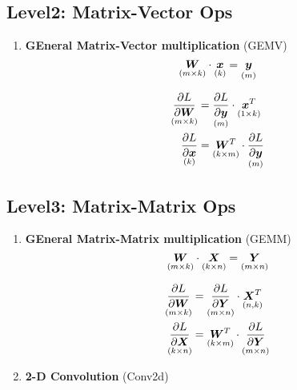 \documentclass[9pt,twocolumn,times]{article}
\begin{document}
\subsection{Level2: Matrix-Vector Ops}

\begin{enumerate}[leftmargin=*]
\item \textbf{GEneral Matrix-Vector multiplication} (GEMV)
\begin{equation}
	\underset{(m\times k)}{{\bm{W}}} \cdot \underset{(k)}{{\bm{x}}} =
	\underset{(m)}{{\bm{y}}}
\end{equation}
\begin{center}
	\resizebox{0.618\columnwidth}{!}{%
		
	}
\end{center}
\begin{align}
	\underset{(m\times k)}{\frac{\partial L}{\partial{\bm{W}}}} &=
	\underset{(m)}{\frac{\partial L}{\partial{\bm{y}}}} \cdot
	\underset{(1\times k)}{{\bm{x}}^T}\\
	\underset{(k)}{\frac{\partial L}{\partial{\bm{x}}}} &=
	\underset{(k\times m)}{{\bm{W}}^T} \cdot
	\underset{(m)}{\frac{\partial L}{\partial {\bm{y}}}}
\end{align}

\end{enumerate}

\subsection{Level3: Matrix-Matrix Ops}

\begin{enumerate}[leftmargin=*]
\item \textbf{GEneral Matrix-Matrix multiplication} (GEMM)
\begin{equation}
	\underset{(m\times k)}{{\bm{W}}} \cdot
	\underset{(k\times n)}{{\bm{X}}} =
	\underset{(m\times n)}{{\bm{Y}}}
\end{equation}
\begin{center}
	\resizebox{0.618\columnwidth}{!}{%
		
	}
\end{center}
\begin{align}
	\underset{(m\times k)}{\frac{\partial L}{\partial{\bm{W}}}} &=
	\underset{(m\times n)}{\frac{\partial L}{\partial{\bm{Y}}}} \cdot
	\underset{(n,k)}{{\bm{X}}^T}\\
	\underset{(k\times n)}{\frac{\partial L}{\partial{\bm{X}}}} &=
	\underset{(k\times m)}{{\bm{W}}^T} \cdot
	\underset{(m\times n)}{\frac{\partial L}{\partial {\bm{Y}}}}
\end{align}

\item \textbf{2-D Convolution} (Conv2d)
\end{enumerate}
\end{document}
